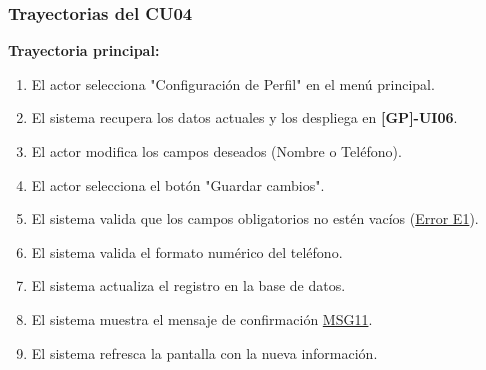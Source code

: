 \begin{appendices}
\subsubsection{Trayectorias del CU04}
\textbf{Trayectoria principal:}
\begin{enumerate}[nosep]
    \item El actor selecciona "Configuración de Perfil" en el menú principal.
    \item El sistema recupera los datos actuales y los despliega en \textbf{[GP]-UI06}.
    \item El actor modifica los campos deseados (Nombre o Teléfono).
    \item El actor selecciona el botón "Guardar cambios".
    \item El sistema valida que los campos obligatorios no estén vacíos (\hyperlink{msg:MSG02}{Error E1}).
    \item El sistema valida el formato numérico del teléfono.
    \item El sistema actualiza el registro en la base de datos.
    \item El sistema muestra el mensaje de confirmación \hyperlink{msg:MSG11}{MSG11}.
    \item El sistema refresca la pantalla con la nueva información.
\end{enumerate}


\end{appendices}
